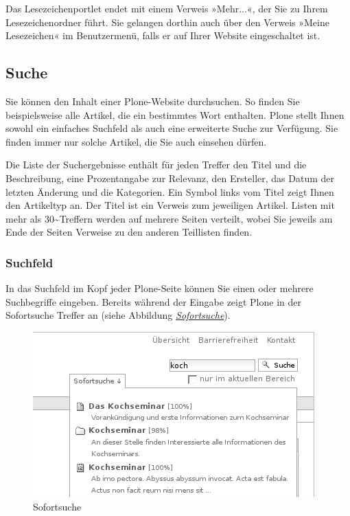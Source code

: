 \documentclass[a4paper,12pt,ngerman]{manual}
\begin{document}
Das Lesezeichenportlet endet mit einem Verweis »Mehr...«, der Sie zu Ihrem
Lesezeichenordner führt. Sie gelangen dorthin auch über den Verweis »Meine
Lesezeichen« im Benutzermenü, falls er auf Ihrer Website eingeschaltet ist.
\hypertarget{sec-suche}{}

\subsection{Suche}

Sie können den Inhalt einer Plone-Website durchsuchen. So finden Sie
beispielsweise alle Artikel, die ein bestimmtes Wort enthalten. Plone
stellt Ihnen sowohl ein einfaches Suchfeld als auch eine erweiterte
Suche zur Verfügung. Sie finden immer nur solche Artikel, die Sie auch
einsehen dürfen.

Die Liste der Suchergebnisse enthält für jeden Treffer den Titel und
die Beschreibung, eine Prozentangabe zur Relevanz, den Ersteller, das
Datum der letzten Änderung und die Kategorien.  Ein Symbol links vom
Titel zeigt Ihnen den Artikeltyp an. Der Titel ist ein Verweis zum
jeweiligen Artikel. Listen mit mehr als 30\textasciitilde{}Treffern werden auf mehrere
Seiten verteilt, wobei Sie jeweils am Ende der Seiten Verweise zu den
anderen Teillisten finden.


\subsubsection{Suchfeld}

In das Suchfeld im Kopf jeder Plone-Seite können Sie einen oder mehrere
Suchbegriffe eingeben. Bereits während der Eingabe zeigt Plone in der Sofortsuche
Treffer an (siehe Abbildung \hyperlink{fig-sofortsuche}{\emph{Sofortsuche}}).
\hypertarget{fig-sofortsuche}{}\begin{figure}[htbp]
\centering

\includegraphics{sofortsuche.png}
\caption{Sofortsuche}\end{figure}
\end{document}
